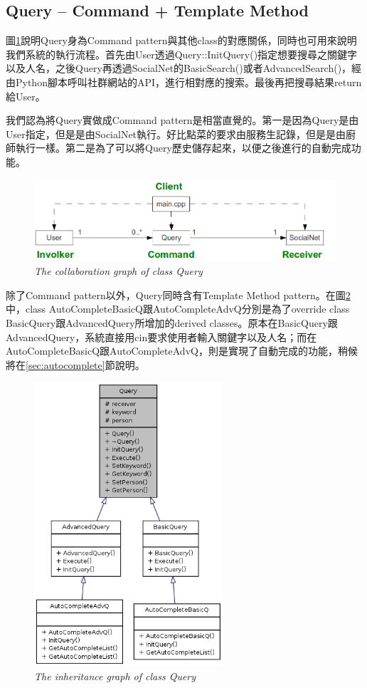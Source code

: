 \documentclass[12pt]{article}
\begin{document}
\subsection{Query -- Command + Template Method}

圖\ref{fig:command}說明Query身為Command pattern與其他class的對應關係，同時也可用來說明我們系統的執行流程。首先由User透過Query::InitQuery()指定想要搜尋之關鍵字以及人名，之後Query再透過SocialNet的BasicSearch()或者AdvancedSearch()，經由Python腳本呼叫社群網站的API，進行相對應的搜索。最後再把搜尋結果return給User。

我們認為將Query實做成Command pattern是相當直覺的。第一是因為Query是由User指定，但是是由SocialNet執行。好比點菜的要求由服務生記錄，但是是由廚師執行一樣。第二是為了可以將Query歷史儲存起來，以便之後進行的自動完成功能。

\begin{figure}[t]
\centering
\includegraphics[width=15cm]{command.png}
\caption{{\it The collaboration graph of class Query}}
\label{fig:command}
\end{figure}

除了Command pattern以外，Query同時含有Template Method pattern。在圖\ref{fig:Query_inherit}中，class AutoCompleteBasicQ跟AutoCompleteAdvQ分別是為了override class BasicQuery跟AdvancedQuery所增加的derived classes。原本在BasicQuery跟AdvancedQuery，系統直接用cin要求使用者輸入關鍵字以及人名；而在AutoCompleteBasicQ跟AutoCompleteAdvQ，則是實現了自動完成的功能，稍候將在\ref{sec:autocomplete}節說明。

\begin{figure}[t]
\centering
\includegraphics[width=7cm]{classQuery__inherit__graph.png}
\caption{{\it The inheritance graph of class Query}}
\label{fig:Query_inherit}
\end{figure}
\end{document}
